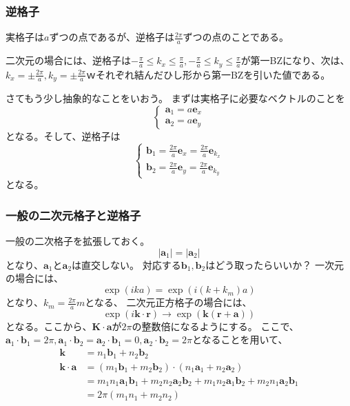 \documentclass[titlepage]{ltjsarticle}
\begin{document}
\subsubsection{逆格子}
実格子は\(a\)ずつの点であるが、逆格子は\(\frac{2\pi}{a}\)ずつの点のことである。

二次元の場合には、逆格子は\(-\frac{\pi}{a}\le k_x \le \frac{\pi}{a},-\frac{\pi}{a}\le k_y \le \frac{\pi}{a}\)が第一BZになり、次は、\(k_x = \pm \frac{2\pi}{a},k_y = \pm \frac{2 \pi}{a}\)ｗそれぞれ結んだひし形から第一BZを引いた値である。

さてもう少し抽象的なことをいおう。
まずは実格子に必要なベクトルのことを
\begin{equation}
  \begin{cases}
    \bm{a}_1 = a \bm{e}_x \\
    \bm{a}_2 = a \bm{e}_y
  \end{cases}
\end{equation}
となる。そして、逆格子は
\begin{equation}
  \begin{cases}
    \bm{b}_1 = \frac{2\pi}{a}\bm{e}_x = \frac{2\pi}{a} \bm{e}_{k_x} \\
    \bm{b}_2 = \frac{2\pi}{a}\bm{e}_y= \frac{2\pi}{a} \bm{e}_{k_y}
  \end{cases}
\end{equation}
となる。

\subsubsection{一般の二次元格子と逆格子}
一般の二次格子を拡張しておく。
\begin{equation}
  |\bm{a}_1 | = | \bm{a}_2 | 
\end{equation}
となり、\( \bm{a}_1\)と\(\bm{a}_2\)は直交しない。
対応する\(\bm{b}_1,\bm{b}_2\)はどう取ったらいいか？
一次元の場合には、
\begin{equation}
  \exp\left( ika \right) = \exp\left( i \left( k + k_m \right)a \right)
\end{equation}
となり、\(k_m = \frac{2\pi}{a}m\)となる、
二次元正方格子の場合には、
\begin{equation}
  \exp \left( i \bm{k} \cdot \bm{r} \right) \to \exp\left( \bm{k}\left( \bm{r} + \bm{a} \right) \right)  
\end{equation}
となる。ここから、\(\bm{K}\cdot \bm{a}\)が\(2 \pi\)の整数倍になるようにする。
ここで、\(\bm{a}_1\cdot \bm{b}_1 = 2\pi,\bm{a}_1 \cdot \bm{b}_2= \bm{a}_2 \cdot \bm{b}_1 = 0, \bm{a}_2 \cdot \bm{b}_2 = 2\pi\)となることを用いて、
\begin{align}
  \bm{k} & = n_1 \bm{b}_1 + n_2 \bm{b}_2 \\
  \bm{k}\cdot \bm{a} & = (m_1 \bm{b}_1 + m_2 \bm{b}_2) \cdot (n_1 \bm{a}_1 + n_2 \bm{a}_2) \\
   & = m_1 n_1 \bm{a}_1 \bm{b}_1 + m_2 n_2 \bm{a}_2 \bm{b}_2 + m_1 n_2 \bm{a}_1 \bm{b}_2 + m_2 n_1 \bm{a}_2 \bm{b}_1\\
   & = 2 \pi (m_1 n_1 + m_2 n_2)
\end{align}
\end{document}
